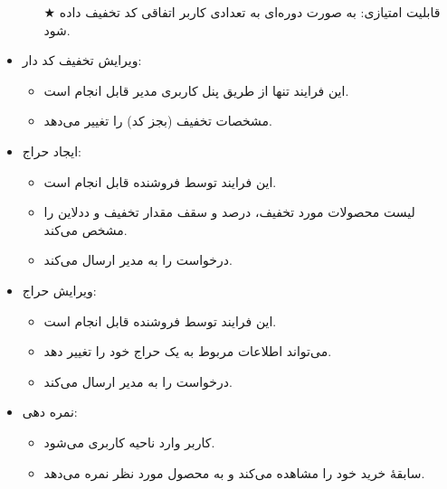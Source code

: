\documentclass[]{article}
\begin{document}
\begin{itemize}
\begin{itemize}
\item[{$\bigstar$}]
قابلیت امتیازی: به صورت دوره‌ای به تعدادی کاربر اتفاقی کد تخفیف داده‌ شود.

\end{itemize}

\item
ویرایش تخفیف کد دار:

\begin{itemize}

\item
این فرایند تنها از طریق پنل کاربری مدیر قابل انجام است.

\item
مشخصات تخفیف (بجز کد) را تغییر می‌دهد.

\end{itemize}

\item
ایجاد حراج:

\begin{itemize}
\item
این فرایند توسط فروشنده قابل انجام است.

\item
لیست محصولات مورد تخفیف، درصد و سقف مقدار تخفیف و ددلاین را مشخص می‌کند.

\item
درخواست را به مدیر ارسال می‌کند.


\end{itemize}
\item
ویرایش حراج:


\begin{itemize}

\item
این فرایند توسط فروشنده قابل انجام است.

\item
می‌تواند اطلاعات مربوط به یک حراج خود را تغییر دهد.

\item
درخواست را به مدیر ارسال می‌کند.

\end{itemize}

\newpage

\item
نمره دهی:


\begin{itemize}

\item
کاربر وارد ناحیه کاربری می‌شود.

\item
سابقهٔ خرید خود را مشاهده می‌کند و به محصول مورد نظر نمره می‌دهد.


\end{itemize}
\end{itemize}
\end{document}
